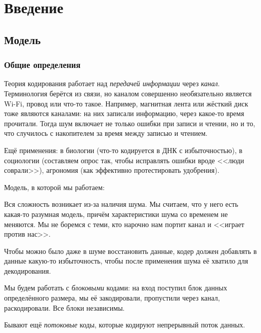 
\chapter{Введение}
\section{Модель}
\subsection{Общие определения}
Теория кодирования работает над \textit{передачей информации} через \textit{канал}.
Терминология берётся из связи, но каналом совершенно необязательно является
Wi-Fi, провод или что-то такое.
Например, магнитная лента или жёсткий диск тоже являются каналами: на них записали информацию,
через какое-то время прочитали.
Тогда шум включает не только ошибки при записи и чтении, но и то, что случилось с
накопителем за время между записью и чтением.

Ещё применения: в биологии (что-то кодируется в ДНК с избыточностью),
в социологии (составляем опрос так, чтобы исправлять ошибки вроде <<люди соврали>>),
агрономия (как эффективно протестировать удобрения).

\begin{Def}
	Модель, в которой мы работаем:

	\centerline{
	}
\end{Def}

Вся сложность возникает из-за наличия шума.
Мы считаем, что у него есть какая-то разумная модель,
причём характеристики шума со временем не меняются.
Мы не боремся с теми, кто нарочно нам портит канал и <<играет против нас>>.

Чтобы можно было даже в шуме восстановить данные, кодер должен добавлять в данные
какую-то избыточность, чтобы после применения шума её хватило для декодирования.

\begin{Def}
	Мы будем работать с \textit{блоковыми} кодами: на вход поступил блок данных определённого размера,
	мы её закодировали, пропустили через канал, раскодировали.
	Все блоки независимы.
\end{Def}
\begin{Rem}
	Бывают ещё \textit{потоковые} коды, которые кодируют непрерывный поток данных.
\end{Rem}

